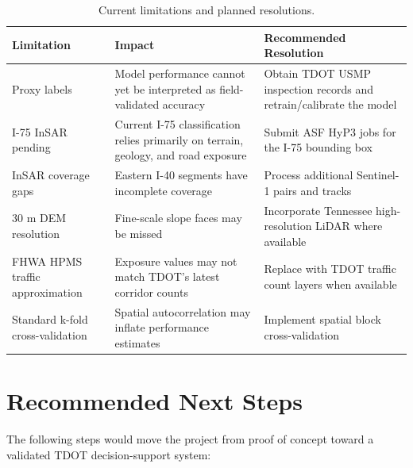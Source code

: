 \documentclass[11pt,letterpaper]{article}
\begin{document}
\begin{table}[H]
\centering
\caption{Current limitations and planned resolutions.}
\label{tab:limitations}
\begin{tabularx}{\linewidth}{L{3.8cm}Y Y}
\toprule
\textbf{Limitation} &
\textbf{Impact} &
\textbf{Recommended Resolution} \\
\midrule
Proxy labels & Model performance cannot yet be interpreted as field-validated accuracy & Obtain TDOT USMP inspection records and retrain/calibrate the model \\
I-75 InSAR pending & Current I-75 classification relies primarily on terrain, geology, and road exposure & Submit ASF HyP3 jobs for the I-75 bounding box \\
InSAR coverage gaps & Eastern I-40 segments have incomplete coverage & Process additional Sentinel-1 pairs and tracks \\
30 m DEM resolution & Fine-scale slope faces may be missed & Incorporate Tennessee high-resolution LiDAR where available \\
FHWA HPMS traffic approximation & Exposure values may not match TDOT's latest corridor counts & Replace with TDOT traffic count layers when available \\
Standard k-fold cross-validation & Spatial autocorrelation may inflate performance estimates & Implement spatial block cross-validation \\
\bottomrule
\end{tabularx}
\end{table}

\section{Recommended Next Steps}
\label{sec:nextsteps}

The following steps would move the project from proof of concept toward a validated TDOT decision-support system:
\end{document}
